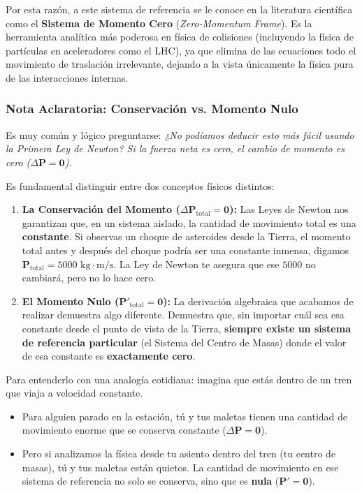 \documentclass[11pt,a4paper]{book}
\begin{document}
Por esta razón, a este sistema de referencia se le conoce en la literatura científica como el \textbf{Sistema de Momento Cero} (\textit{Zero-Momentum Frame}). Es la herramienta analítica más poderosa en física de colisiones (incluyendo la física de partículas en aceleradores como el LHC), ya que elimina de las ecuaciones todo el movimiento de traslación irrelevante, dejando a la vista únicamente la física pura de las interacciones internas.

\subsubsection*{Nota Aclaratoria: Conservación vs. Momento Nulo}

Es muy común y lógico preguntarse: \textit{¿No podíamos deducir esto más fácil usando la Primera Ley de Newton? Si la fuerza neta es cero, el cambio de momento es cero ($\Delta \boldsymbol{P} = \boldsymbol{0}$)}.

Es fundamental distinguir entre dos conceptos físicos distintos:
\begin{enumerate}
    \item \textbf{La Conservación del Momento ($\Delta \boldsymbol{P}_{\text{total}} = \boldsymbol{0}$):} Las Leyes de Newton nos garantizan que, en un sistema aislado, la cantidad de movimiento total es una \textbf{constante}. Si observas un choque de asteroides desde la Tierra, el momento total antes y después del choque podría ser una constante inmensa, digamos $\boldsymbol{P}_{\text{total}} = 5000 \text{ kg}\cdot\text{m/s}$. La Ley de Newton te asegura que ese $5000$ no cambiará, pero no lo hace cero.
    
    \item \textbf{El Momento Nulo ($\boldsymbol{P}'_{\text{total}} = \boldsymbol{0}$):} La derivación algebraica que acabamos de realizar demuestra algo diferente. Demuestra que, sin importar cuál sea esa constante desde el punto de vista de la Tierra, \textbf{siempre existe un sistema de referencia particular} (el Sistema del Centro de Masas) donde el valor de esa constante es \textbf{exactamente cero}.
\end{enumerate}

Para entenderlo con una analogía cotidiana: imagina que estás dentro de un tren que viaja a velocidad constante. 
\begin{itemize}
    \item Para alguien parado en la estación, tú y tus maletas tienen una cantidad de movimiento enorme que se conserva constante ($\Delta \boldsymbol{P} = \boldsymbol{0}$). 
    \item Pero si analizamos la física desde tu asiento dentro del tren (tu centro de masas), tú y tus maletas están quietos. La cantidad de movimiento en ese sistema de referencia no solo se conserva, sino que es \textbf{nula} ($\boldsymbol{P}' = \boldsymbol{0}$).
\end{itemize}
\end{document}
